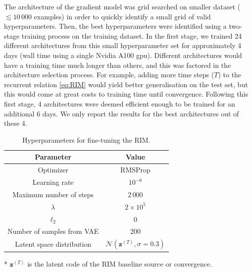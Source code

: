 The architecture of the gradient model was grid searched on 
smaller dataset ($\lesssim 10\,000$ examples) 
in order to quickly identify a small grid 
of valid hyperparameters. Then, the best hyperparameters were 
identified using a two-stage training process on the training dataset. 
In the first stage, we trained 24 different architectures from this small 
hyperparameter set for approximately 4 days (wall time using a single Nvidia A100 gpu). 
Different architectures would have a training time much longer than others, and this 
was factored in the architecture selection process. For example, adding more time 
steps ($T$) to the recurrent relation \eqref{eq:RIM} 
would yield better generalisation on the test set, but this 
would come at great costs to training time until convergence. 
Following this first stage, 4 architectures were deemed efficient enough 
to be trained for an additional 6 days. 
We only report the results for the best architectures out of these 4.

\begin{table}[ht!]
\centering
\begin{threeparttable}
        \caption{Hyperparameters for fine-tuning the RIM.}
        \label{tab:fine-tuning hparams}
        \begin{tabular}{cc}
                Parameter & Value \\\hline\hline
                Optimizer & RMSProp \\
                Learning rate & $10^{-6}$\\
                Maximum number of steps & $2\,000$\\
                $\lambda$ & $2\times 10^{5}$\\
                $\ell_2$ & 0 \\
                Number of samples from VAE & 200 \\
                Latent space distribution & $\mathcal{N}(\mathbf{z}^{(T)}, \sigma=0.3)$\tnote{*}\\
                \hline
        \end{tabular}
\begin{tablenotes}\footnotesize
\item[*]$\mathbf{z}^{(T)}$ is the latent code of the RIM baseline source or convergence.
\end{tablenotes}
\end{threeparttable}
\end{table}

